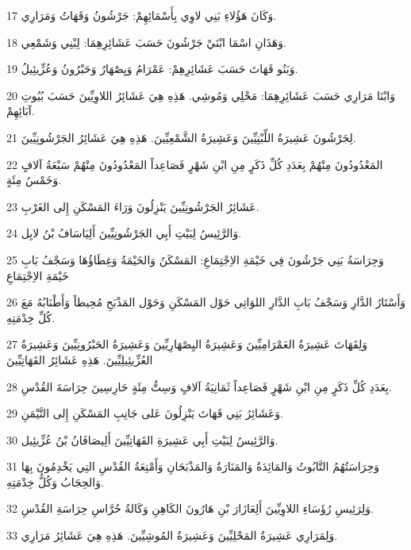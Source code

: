 \par 17 وَكَانَ هَؤُلاءِ بَنِي لاوِي بِأَسْمَائِهِمْ: جَرْشُونُ وَقَهَاتُ وَمَرَارِي.
\par 18 وَهَذَانِ اسْمَا ابْنَيْ جَرْشُونَ حَسَبَ عَشَائِرِهِمَا: لِبْنِي وَشَمْعِي.
\par 19 وَبَنُو قَهَاتَ حَسَبَ عَشَائِرِهِمْ: عَمْرَامُ وَيِصْهَارُ وَحَبْرُونُ وَعُزِّيئِيلُ.
\par 20 وَابْنَا مَرَارِي حَسَبَ عَشَائِرِهِمَا: مَحْلِي وَمُوشِي. هَذِهِ هِيَ عَشَائِرُ اللاوِيِّينَ حَسَبَ بُيُوتِ آبَائِهِمْ.
\par 21 لِجَرْشُونَ عَشِيرَةُ اللِّبْنِيِّينَ وَعَشِيرَةُ الشَّمْعِيِّينَ. هَذِهِ هِيَ عَشَائِرُ الجَرْشُونِيِّينَ.
\par 22 المَعْدُودُونَ مِنْهُمْ بِعَدَدِ كُلِّ ذَكَرٍ مِنِ ابْنِ شَهْرٍ فَصَاعِداً المَعْدُودُونَ مِنْهُمْ سَبْعَةُ آلافٍ وَخَمْسُ مِئَةٍ.
\par 23 عَشَائِرُ الجَرْشُونِيِّينَ يَنْزِلُونَ وَرَاءَ المَسْكَنِ إِلى الغَرْبِ.
\par 24 وَالرَّئِيسُ لِبَيْتِ أَبِي الجَرْشُونِيِّينَ أَلِيَاسَافُ بْنُ لايِل.
\par 25 وَحِرَاسَةُ بَنِي جَرْشُونَ فِي خَيْمَةِ الاِجْتِمَاعِ: المَسْكَنُ وَالخَيْمَةُ وَغِطَاؤُهَا وَسَجْفُ بَابِ خَيْمَةِ الاِجْتِمَاعِ
\par 26 وَأَسْتَارُ الدَّارِ وَسَجْفُ بَابِ الدَّارِ اللوَاتِي حَوْل المَسْكَنِ وَحَوْل المَذْبَحِ مُحِيطاً وَأَطْنَابُهُ مَعَ كُلِّ خِدْمَتِهِ.
\par 27 وَلِقَهَاتَ عَشِيرَةُ العَمْرَامِيِّينَ وَعَشِيرَةُ اليِصْهَارِيِّينَ وَعَشِيرَةُ الحَبْرُونِيِّينَ وَعَشِيرَةُ العُزِّيئِيلِيِّينَ. هَذِهِ عَشَائِرُ القَهَاتِيِّينَ
\par 28 بِعَدَدِ كُلِّ ذَكَرٍ مِنِ ابْنِ شَهْرٍ فَصَاعِداً ثَمَانِيَةُ آلافٍ وَسِتُّ مِئَةٍ حَارِسِينَ حِرَاسَةَ القُدْسِ.
\par 29 وَعَشَائِرُ بَنِي قَهَاتَ يَنْزِلُونَ عَلى جَانِبِ المَسْكَنِ إِلى التَّيْمَنِ.
\par 30 وَالرَّئِيسُ لِبَيْتِ أَبِي عَشِيرَةِ القَهَاتِيِّينَ أَلِيصَافَانُ بْنُ عُزِّيئِيل.
\par 31 وَحِرَاسَتُهُمُ التَّابُوتُ وَالمَائِدَةُ وَالمَنَارَةُ وَالمَذْبَحَانِ وَأَمْتِعَةُ القُدْسِ التِي يَخْدِمُونَ بِهَا وَالحِجَابُ وَكُلُّ خِدْمَتِهِ.
\par 32 وَلِرَئِيسِ رُؤَسَاءِ اللاوِيِّينَ أَلِعَازَارَ بْنِ هَارُونَ الكَاهِنِ وَكَالةُ حُرَّاسِ حِرَاسَةِ القُدْسِ.
\par 33 وَلِمَرَارِي عَشِيرَةُ المَحْلِيِّينَ وَعَشِيرَةُ المُوشِيِّينَ. هَذِهِ هِيَ عَشَائِرُ مَرَارِي.
